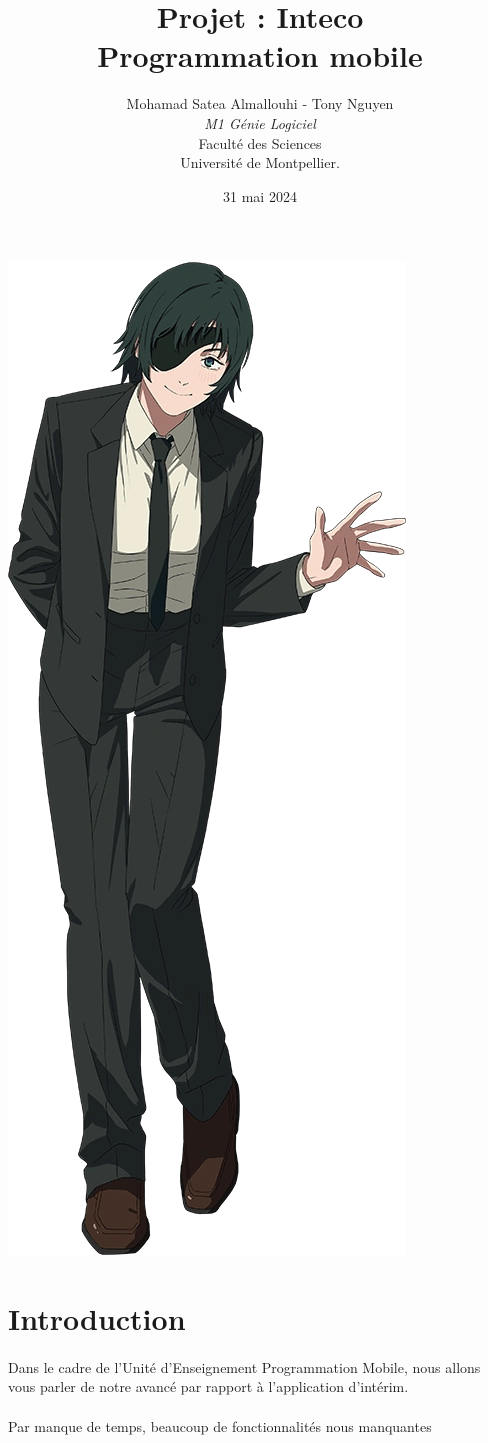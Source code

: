 \documentclass[a4paper]{article}
\title{  Projet : Inteco\\Programmation mobile}
\author{Mohamad Satea Almallouhi - Tony Nguyen\\\emph{M1 Génie Logiciel}\\Faculté des Sciences\\Université de Montpellier.}
\date{31 mai 2024}
\begin{document}
    \maketitle
    \begin{center}
        \includegraphics[height=.95\textwidth]{himeno}
    \end{center}

    \newpage
    \tableofcontents
    \section*{Introduction}
            \paragraph{}
                Dans le cadre de l'Unité d'Enseignement Programmation Mobile, nous allons vous parler de notre avancé par rapport à l'application d'intérim.
            \paragraph{}
                Par manque de temps, beaucoup de fonctionnalités nous manquantes
\end{document}
